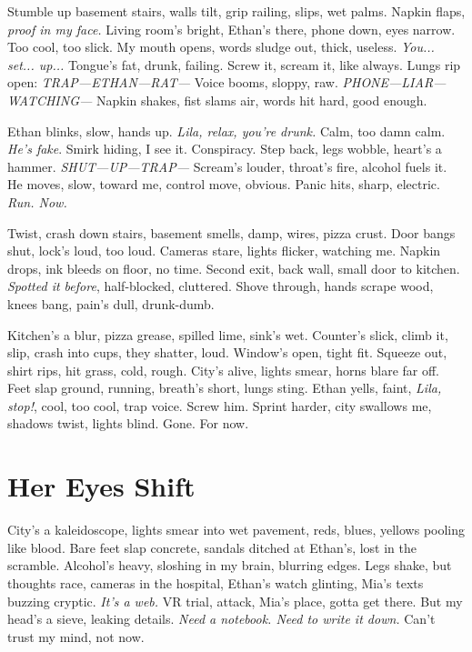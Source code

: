 \documentclass[12pt,oneside]{book}
\begin{document}
Stumble up basement stairs, walls tilt, grip railing, slips, wet palms. Napkin flaps, \textit{proof in my face.} Living room’s bright, Ethan’s there, phone down, eyes narrow. Too cool, too slick. My mouth opens, words sludge out, thick, useless. \textit{You... set... up...} Tongue’s fat, drunk, failing. Screw it, scream it, like always. Lungs rip open: \textit{TRAP—ETHAN—RAT—} Voice booms, sloppy, raw. \textit{PHONE—LIAR—WATCHING—} Napkin shakes, fist slams air, words hit hard, good enough.

Ethan blinks, slow, hands up. \textit{Lila, relax, you’re drunk.} Calm, too damn calm. \textit{He's fake}. Smirk hiding, I see it. Conspiracy. Step back, legs wobble, heart’s a hammer. \textit{SHUT—UP—TRAP—} Scream’s louder, throat’s fire, alcohol fuels it. He moves, slow, toward me, control move, obvious. Panic hits, sharp, electric. \textit{Run. Now.}

Twist, crash down stairs, basement smells, damp, wires, pizza crust. Door bangs shut, lock’s loud, too loud. Cameras stare, lights flicker, watching me. Napkin drops, ink bleeds on floor, no time. Second exit, back wall, small door to kitchen. \textit{Spotted it before}, half-blocked, cluttered. Shove through, hands scrape wood, knees bang, pain’s dull, drunk-dumb.

Kitchen’s a blur, pizza grease, spilled lime, sink’s wet. Counter’s slick, climb it, slip, crash into cups, they shatter, loud. Window’s open, tight fit. Squeeze out, shirt rips, hit grass, cold, rough. City’s alive, lights smear, horns blare far off. Feet slap ground, running, breath’s short, lungs sting. Ethan yells, faint, \textit{Lila, stop!}, cool, too cool, trap voice. Screw him. Sprint harder, city swallows me, shadows twist, lights blind. Gone. For now.

\chapter{Her Eyes Shift}

City’s a kaleidoscope, lights smear into wet pavement, reds, blues, yellows pooling like blood. Bare feet slap concrete, sandals ditched at Ethan’s, lost in the scramble. Alcohol’s heavy, sloshing in my brain, blurring edges. Legs shake, but thoughts race, cameras in the hospital, Ethan’s watch glinting, Mia’s texts buzzing cryptic. \textit{It’s a web.} VR trial, attack, Mia’s place, gotta get there. But my head’s a sieve, leaking details. \textit{Need a notebook. Need to write it down.} Can’t trust my mind, not now.
\end{document}
